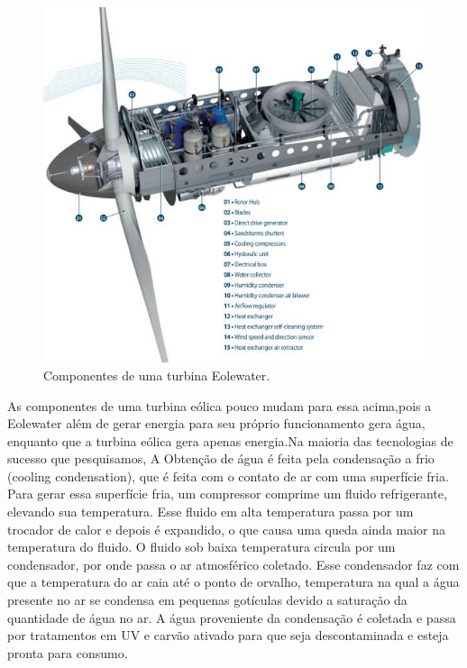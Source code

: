 \documentclass[12pt,openright,oneside,a4paper,brazil]{abntex2}
\begin{document}
\begin{figure}[!htbp]
\centering
\includegraphics[scale=0.6]{Componentes}
\caption[Caption title in LOF]{Componentes de uma turbina Eolewater.\footnotemark}
\FloatBarrier
\label{Max_Water}
\end{figure}


As componentes de uma turbina eólica pouco mudam para essa acima,pois a Eolewater além de gerar energia para seu próprio funcionamento gera água, enquanto que a turbina eólica gera apenas energia.Na maioria das tecnologias de sucesso que pesquisamos, A Obtenção de água é feita pela condensação  a frio (cooling condensation), que é feita com o contato de ar com uma superfície fria. Para gerar essa superfície fria, um compressor comprime um fluido refrigerante, elevando sua temperatura. Esse fluido em alta temperatura passa por um trocador de calor e depois é expandido, o que causa uma queda ainda maior na temperatura do fluido. O fluido sob baixa temperatura circula por um condensador, por onde passa o ar atmosférico coletado. Esse condensador faz com que a temperatura do ar caia até o ponto de orvalho, temperatura na qual a água presente no ar se condensa em pequenas gotículas devido a saturação da quantidade de água no ar. A água proveniente da condensação é coletada e passa por tratamentos em UV e carvão ativado para que seja descontaminada e esteja pronta para consumo.
\end{document}
